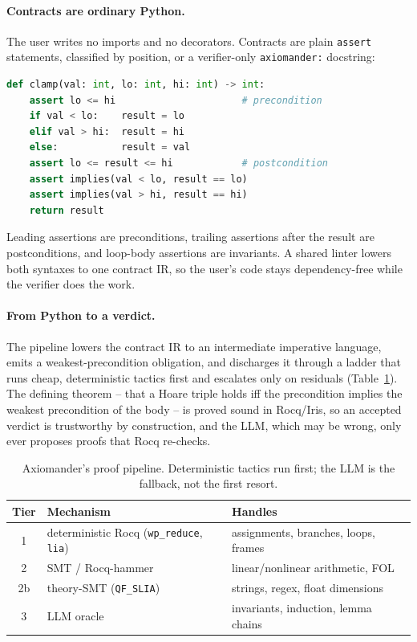\documentclass[sigconf,nonacm]{acmart}
\newcommand{\code}[1]{\texttt{#1}}
\begin{document}
\paragraph{Contracts are ordinary Python.} The user writes no imports and no
decorators. Contracts are plain \code{assert} statements, classified by position,
or a verifier-only \code{axiomander:} docstring:

\begin{lstlisting}[language=Python]
def clamp(val: int, lo: int, hi: int) -> int:
    assert lo <= hi                      # precondition
    if val < lo:    result = lo
    elif val > hi:  result = hi
    else:           result = val
    assert lo <= result <= hi            # postcondition
    assert implies(val < lo, result == lo)
    assert implies(val > hi, result == hi)
    return result
\end{lstlisting}

Leading assertions are preconditions, trailing assertions after the result are
postconditions, and loop-body assertions are invariants. A shared linter lowers
both syntaxes to one contract IR, so the user's code stays dependency-free while
the verifier does the work.

\paragraph{From Python to a verdict.} The pipeline lowers the contract IR to an
intermediate imperative language, emits a weakest-precondition obligation, and
discharges it through a ladder that runs cheap, deterministic tactics first and
escalates only on residuals (Table~\ref{tab:pipeline}). The defining theorem --
that a Hoare triple holds iff the precondition implies the weakest precondition
of the body -- is proved sound in Rocq/Iris, so an accepted verdict is
trustworthy by construction, and the LLM, which may be wrong, only ever proposes
proofs that Rocq re-checks.

\begin{table}[t]
\caption{Axiomander's proof pipeline. Deterministic tactics run first; the LLM is
the fallback, not the first resort.}
\label{tab:pipeline}
\small
\begin{tabular}{@{}cll@{}}
\toprule
Tier & Mechanism & Handles \\
\midrule
1  & deterministic Rocq (\code{wp\_reduce}, \code{lia}) & assignments, branches, loops, frames \\
2  & SMT / Rocq-hammer & linear/nonlinear arithmetic, FOL \\
2b & theory-SMT (\code{QF\_SLIA}) & strings, regex, float dimensions \\
3  & LLM oracle & invariants, induction, lemma chains \\
\bottomrule
\end{tabular}
\end{table}
\end{document}
